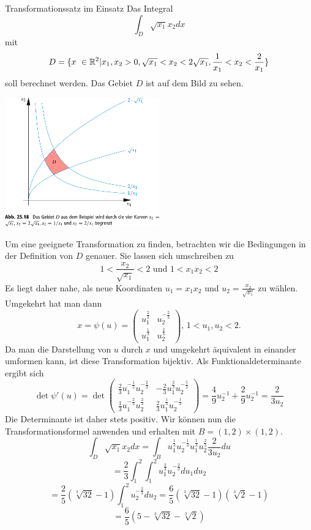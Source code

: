 \begin{Beispiel}{Transformationssatz im Einsatz}
Das Integral $$\int_D \sqrt{x_1}x_2 dx$$ mit $$D=\{ x\ \in\mathbb{R}^2 | x_1, x_2 >0, \sqrt{x_1}<x_2<2\sqrt{x_1}, \frac{1}{x_1}<x_2<\frac{2}{x_1}\}$$
soll berechnet werden. Das Gebiet $D$ ist auf dem Bild zu sehen. \\
            \begin{center}
    \includegraphics[width=0.50\textwidth]{Dateien/Trafo.pdf}
\end{center}
Um eine geeignete Transformation zu finden, betrachten wir die Bedingungen in der Definition von $D$ genauer. Sie lassen sich umschreiben zu
$$1<\frac{x_2}{\sqrt{x_1}}<2 \mbox{ und } 1<x_1x_2<2$$
Es liegt daher nahe, als neue Koordinaten $u_1=x_1x_2$ und $u_2=\frac{x_2}{\sqrt{x_1}}$ zu wählen. Umgekehrt hat man dann
$$x=\psi(u)=\begin{pmatrix}
    u_1^{\frac{2}{3}} & u_2^{-\frac{2}{3}} \\
    u_1^{\frac{1}{3}} & u_2^{\frac{2}{3}}
\end{pmatrix} \mbox{, $1<u_1, u_2 < 2$.}$$
Da man die Darstellung von $u$ durch $x$ und umgekehrt äquivalent in einander umformen kann, ist diese Transformation bijektiv. Als Funktionaldeterminante ergibt sich
$$\det \psi '(u)=\det \begin{pmatrix}
    \frac{2}{3}u_1^{{-\frac{1}{3}}}u_2^{-{\frac{2}{3}}} & -\frac{2}{3}u_1^{\frac{2}{3}}u_2^{-{\frac{5}{3}}} \\
    \frac{1}{3}u_1^{-{\frac{2}{3}}}u_2^{\frac{2}{3}} & {\frac{2}{3}}u_1^{\frac{1}{3}}u_2^{-\frac{1}{3}}
\end{pmatrix}=\frac{4}{9}u_2^{-1}+\frac{2}{9}u_2^{-1}=\frac{2}{3u_2}$$
Die Determinante ist daher stets positiv. Wir können nun die Transformationsformel anwenden und erhalten mit $B=(1,2)\times(1,2)$.
$$\int_D \sqrt{x_1}x_2 dx = \int_B u_1^{\frac{1}{3}}u_2^{-\frac{1}{3}}u_1^{\frac{1}{3}}u_2^{\frac{2}{3}}\frac{2}{3u_2}du$$
$$=\frac{2}{3}\int_1^2 \int_1^2 u_1^{\frac{2}{3}}u_2^{-\frac{2}{3}}du_1du_2$$
$$=\frac{2}{5}(\sqrt[3]{32}-1)\int_1^2 u_2^{-{\frac{2}{3}}}du_2=\frac{6}{5}(\sqrt[3]{32}-1)(\sqrt[3]{2}-1)$$
$$=\frac{6}{5}(5-\sqrt[3]{32}-\sqrt[3]{2})$$

\end{Beispiel}
\newpage
